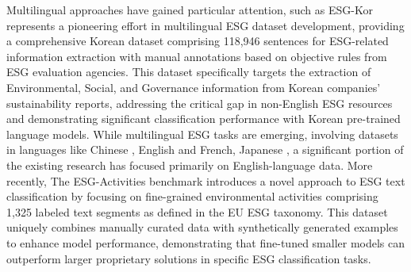 \documentclass[12pt, letterpaper]{template}
\begin{document}
Multilingual approaches have gained particular attention, such as ESG-Kor \citep{esgkor} represents a pioneering effort in multilingual ESG dataset development, providing a comprehensive Korean dataset comprising 118,946 sentences for ESG-related information extraction with manual annotations based on objective rules from ESG evaluation agencies. This dataset specifically targets the extraction of Environmental, Social, and Governance information from Korean companies' sustainability reports, addressing the critical gap in non-English ESG resources and demonstrating significant classification performance with Korean pre-trained language models. While multilingual ESG tasks are emerging, involving datasets in languages like Chinese \citep{Pontes2023}, English \citep{chen-etal-2023-multi-lingual} and French, Japanese \citep{kao-etal-2024-imntpu}, a significant portion of the existing research has focused primarily on English-language data. More recently, The ESG-Activities benchmark \citep{esgactive} introduces a novel approach to ESG text classification by focusing on fine-grained environmental activities comprising 1,325 labeled text segments as defined in the EU ESG taxonomy. This dataset uniquely combines manually curated data with synthetically generated examples to enhance model performance, demonstrating that fine-tuned smaller models can outperform larger proprietary solutions in specific ESG classification tasks. 


\end{document}

